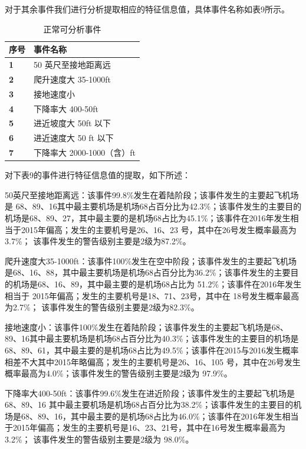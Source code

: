 \documentclass[UTF8]{ctexart}
\begin{document}
对于其余事件我们进行分析提取相应的特征信息值，具体事件名称如表9所示。\par
\begin{table}[!ht]
	\centering
	\caption{正常可分析事件 }
	\begin{tabular}{|l|l|}
		\hline
		\textbf{序号} & \textbf{事件名称} \\ \hline
		\textbf{1} & 50 英尺至接地距离远 \\ 
		\textbf{2} & 爬升速度大 35-1000ft \\ 
		\textbf{3} & 接地速度小 \\ 
		\textbf{4} & 下降率大 400-50ft \\ 
		\textbf{5} & 进近坡度大 50ft 以下 \\ 
		\textbf{6} & 进近速度大 50 ft 以下 \\ 
		\textbf{7} & 下降率大 2000-1000（含）ft \\ \hline
	\end{tabular}
\end{table}\par
对下表9的事件进行特征信息值的提取，如下所述： \par
50英尺至接地距离远：该事件99.8\%发生在着陆阶段；该事件发生的主要起飞机场是 68、89、16其中最主要机场是机场68占百分比为42.3\%；该事件发生的主要目的机场是68、89、27，其中最主要的是机场68占比为45.1\%；该事件在2016年发生相当于2015年偏高；发生的主要机号是26、16、23 号，其中在26号发生概率最高为3.7\%； 该事件发生的警告级别主要是2级为87.2\%。 \par
爬升速度大35-1000ft：该事件100\%发生在空中阶段；该事件发生的主要起飞机场是68、16、88，其中最主要机场是机场68占百分比为36.2\%；该事件发生的主要目的机场是68、16、89，其中最主要的是机场68占比为 51.2\%；该事件在2016年发生相当于 2015年偏高；发生的主要机号是18、71、23号，其中在 18号发生概率最高为2.7\%； 该事件发生的警告级别主要是2级为82.3\%。 \par
接地速度小：该事件100\%发生在着陆阶段；该事件发生的主要起飞机场是68、89、16其中最主要机场是机场68占百分比为40.3\%；该事件发生的主要目的机场是68、89、61，其中最主要的是机场68占比为49.5\%；该事件在2015与2016发生概率相差不大其中2015年略偏高；发生的主要机号是26、16、105 号，其中在26号发生概率最高为4.0\%；该事件发生的警告级别主要是2级为 97.9\%。 \par
下降率大400-50ft：该事件99.6\%发生在进近阶段；该事件发生的主要起飞机场是68、89、16 其中最主要机场是机场68占百分比为38.2\%；该事件发生的主要目的机场是68、89、16，其中最主要的是机场68占比为46.0\%；该事件在2016年发生相当于2015年偏高；发生的主要机号是16、23、21号，其中在16号发生概率最高为3.2\%； 该事件发生的警告级别主要是2级为 98.0\%。 \par
\end{document}
